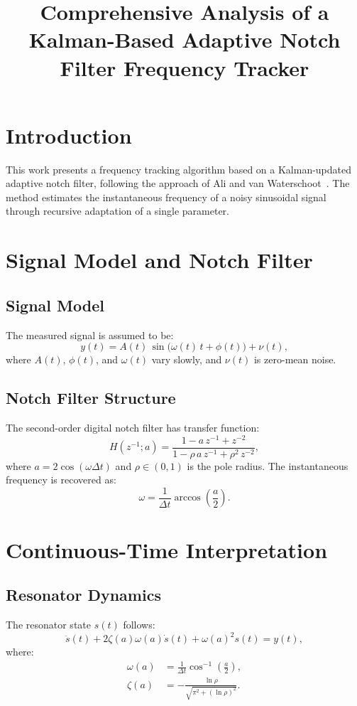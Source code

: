 \documentclass{article}
\title{Comprehensive Analysis of a Kalman-Based Adaptive Notch Filter Frequency Tracker}
\author{}
\date{}
\begin{document}
\maketitle

\section{Introduction}
This work presents a frequency tracking algorithm based on a Kalman-updated adaptive notch filter, following the approach of Ali and van Waterschoot~\cite{AliWaterschoot2023}. The method estimates the instantaneous frequency of a noisy sinusoidal signal through recursive adaptation of a single parameter.

\section{Signal Model and Notch Filter}
\subsection{Signal Model}
The measured signal is assumed to be:
\begin{equation}
y(t) = A(t)\,\sin\bigl(\omega(t)\,t + \phi(t)\bigr) + \nu(t),
\label{eq:signal_model}
\end{equation}
where $A(t)$, $\phi(t)$, and $\omega(t)$ vary slowly, and $\nu(t)$ is zero-mean noise.

\subsection{Notch Filter Structure}
The second-order digital notch filter has transfer function:
\begin{equation}
H(z^{-1};a) = \frac{1 - a\,z^{-1} + z^{-2}}{1 - \rho\,a\,z^{-1} + \rho^2\,z^{-2}},
\label{eq:notch_tf}
\end{equation}
where $a = 2\cos(\omega \Delta t)$ and $\rho \in (0,1)$ is the pole radius. The instantaneous frequency is recovered as:
\begin{equation}
\omega = \frac{1}{\Delta t}\arccos\!\left(\frac{a}{2}\right).
\label{eq:freq_estimate}
\end{equation}

\section{Continuous-Time Interpretation}
\subsection{Resonator Dynamics}
The resonator state $s(t)$ follows:
\begin{equation}
\ddot{s}(t) + 2\zeta(a)\omega(a)\dot{s}(t) + \omega(a)^2 s(t) = y(t),
\label{eq:resonator_dynamics}
\end{equation}
where:
\begin{align}
\omega(a) &= \frac{1}{\Delta t}\cos^{-1}\!\left(\frac{a}{2}\right), \label{eq:omega_def} \\
\zeta(a) &= -\frac{\ln\rho}{\sqrt{\pi^2 + (\ln\rho)^2}}. \label{eq:zeta_def}
\end{align}
\end{document}
